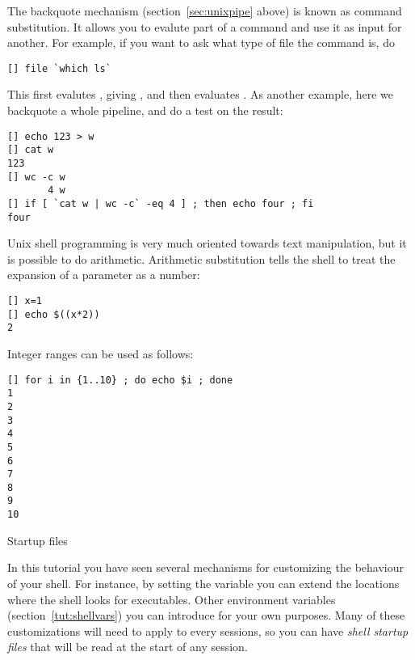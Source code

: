 \begin{comment}
There are ways of doing pattern matching and substitution 
on a variable:
\begin{verbatim}
[] f=x.fort
[] echo ${f%%.fort}
x
[] echo ${f%%.fort}.bak
x.bak
\end{verbatim}
\end{comment}

The backquote mechanism (section~\ref{sec:unixpipe} above)
is known as command substitution. It allows you to evalute part
of a command and use it as input for another. For example,
if you want to ask what type of file the command  is, do
\begin{verbatim}
[] file `which ls`
\end{verbatim}
This first evalutes , giving , and then
evaluates . As another example, here
we backquote a whole pipeline, and do a test on the result:
\begin{verbatim}
[] echo 123 > w
[] cat w
123
[] wc -c w
       4 w
[] if [ `cat w | wc -c` -eq 4 ] ; then echo four ; fi
four
\end{verbatim}

Unix shell programming is very much oriented towards text manipulation, but it 
is possible to do arithmetic. 
Arithmetic substitution tells the shell to treat the expansion of a
parameter as a number:
\begin{verbatim}
[] x=1
[] echo $((x*2))
2
\end{verbatim}

Integer ranges can be used as follows:
\begin{verbatim}
[] for i in {1..10} ; do echo $i ; done
1
2
3
4
5
6
7
8
9
10
\end{verbatim}

 {Startup files}

In this tutorial you have seen several mechanisms for customizing
the behaviour of your shell. For instance, by setting the 
variable you can extend the locations where the shell looks for executables.
Other environment variables (section~\ref{tut:shellvars}) you can
introduce for your own purposes. Many of these customizations will
need to apply to every sessions, so you can have 
\emph{shell startup files} that will be read at the start of any session.

